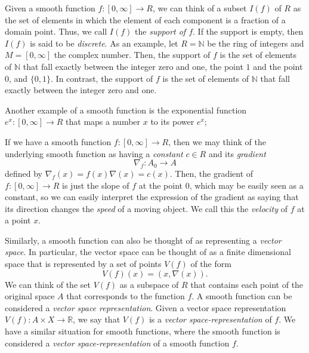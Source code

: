 \documentclass[a4paper,reqno,oneside]{article}
\begin{document}
Given a smooth function $f: [0,\infty]\to R$, we can think of a subset $I(f)$ of $R$ as the set of elements in which the element of each component is a fraction of a domain point. Thus, we call $I(f)$ the \textit{support of $f$}. If the support is empty, then $I(f)$ is said to be \textit{discrete}. As an example, let $R=\mathbb{N}$ be the ring of integers and $M=[0,\infty]$ the complex number. Then, the support of $f$ is the set of elements of $\mathbb{N}$ that fall exactly between the integer zero and one, the point $1$ and the point $0$, and $\{0,1\}$. In contrast, the support of $f$ is the set of elements of $\mathbb{N}$ that fall exactly between the integer zero and one.

Another example of a smooth function is the exponential function $e^x: [0, \infty]\to R$ that maps a number $x$ to its power $e^x$;

\begin{center}
\end{center}

If we have a smooth function $f: [0,\infty]\to R$, then we may think of the underlying smooth function as having a \textit{constant} $c\in R$ and its \textit{gradient}
\[\nabla_f: A_0 \to A\]
defined by $\nabla_f(x)=f(x)\nabla(x)=c(x)$.
Then, the gradient of $f: [0,\infty]\to R$ is just the slope of $f$ at the point $0$, which may be easily seen as a constant, so we can easily interpret the expression of the gradient as saying that its direction changes the \textit{speed} of a moving object. We call this the \textit{velocity} of $f$ at a point $x$.

Similarly, a smooth function can also be thought of as representing a \textit{vector space}. In particular, the vector space can be thought of as a finite dimensional space that is represented by a set of points $V(f)$ of the form
\[
V(f)(x)=(x, \nabla(x)).
\]
We can think of the set $V(f)$ as a subspace of $R$ that contains each point of the original space $A$ that corresponds to the function $f$. A smooth function can be considered a \textit{vector space representation}. Given a vector space representation $V(f):A\times X \to \mathbb{R}$, we say that $V(f)$ is a \textit{vector space-representation} of $f$. We have a similar situation for smooth functions, where the smooth function is considered a \textit{vector space-representation} of a smooth function $f$.
\end{document}

